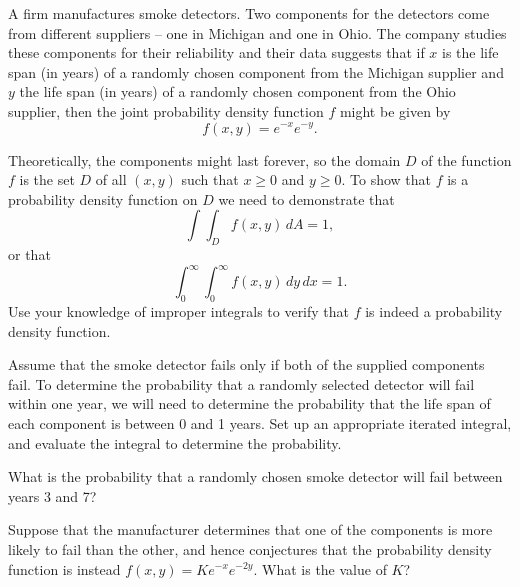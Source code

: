 \begin{activity} \label{A:11.4.6} A firm manufactures smoke detectors. Two components for the detectors come from different suppliers -- one in Michigan and one in Ohio. The company studies these components for their reliability and their data suggests that if $x$ is the life span (in years) of a randomly chosen component from the Michigan supplier and $y$ the life span (in years) of a randomly chosen component from the Ohio supplier, then the joint probability density function $f$ might be given by
\[f(x,y) = e^{-x} e^{-y}.\]
    \ba
    \item Theoretically, the components might last forever, so the domain $D$ of the function $f$ is the set $D$ of all $(x,y)$ such that $x \ge 0$ and $y \ge 0$. To show that $f$ is a probability density function on $D$ we need to demonstrate that
        \[\int \int_D f(x,y) \, dA = 1,\]
        or that
        \[\int_0^{\infty} \int_0^{\infty} f(x,y) \, dy \, dx = 1.\]
        Use your knowledge of improper integrals to verify that $f$ is indeed a probability density function.

    \item Assume that the smoke detector fails only if both of the supplied components fail. To determine the probability that a randomly selected detector will fail within one year, we will need to determine the probability that the life span of each component is between 0 and 1 years. Set up an appropriate iterated integral, and evaluate the integral to determine the probability.
    
    \item What is the probability that a randomly chosen smoke detector will fail between years 3 and 7?
    
    \item Suppose that the manufacturer determines that one of the components is more likely to fail than the other, and hence conjectures that the probability density function is instead $f(x,y) = K e^{-x} e^{-2y}.$  What is the value of $K$?

    \ea

\end{activity}
\begin{smallhint}

\end{smallhint}
\begin{bighint}

\end{bighint}
